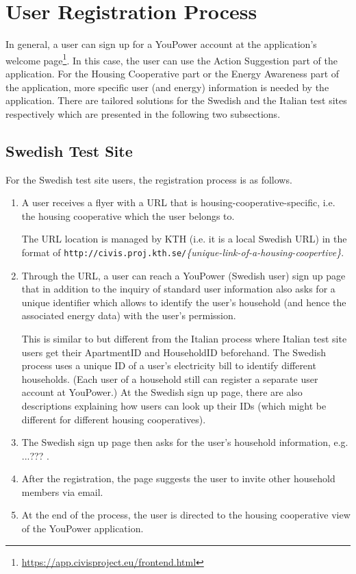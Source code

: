 \section{User Registration Process}

In general, a user can sign up for a YouPower account at the application's welcome page\footnote{\url{https://app.civisproject.eu/frontend.html}}. In this case, the user can use the Action Suggestion part of the application. For the Housing Cooperative part or the Energy Awareness part of the application, more specific user (and energy) information is needed by the application. There are tailored solutions for the Swedish and the Italian test sites respectively which are presented in the following two subsections. 

\subsection{Swedish Test Site}

For the Swedish test site users, the registration process is as follows. 

\begin{enumerate}
\item A user receives a flyer with a URL that is housing-cooperative-specific, i.e. the housing cooperative which the user belongs to. 

The URL location is managed by KTH (i.e. it is a local Swedish URL) in the format of  \texttt{\small http://civis.proj.kth.se/}\textit{\{unique-link-of-a-housing-coopertive\}}. 

\item Through the URL, a user can reach a YouPower (Swedish user) sign up page that in addition to the inquiry of standard user information also asks for a unique identifier which allows to identify the user's household (and hence the associated energy data) with the user's permission. 

This is similar to but different from the Italian process where Italian test site users get their ApartmentID and HouseholdID beforehand. The Swedish process uses a unique ID of a user's electricity bill to identify different households. (Each user of a household still can register a separate user account at YouPower.) At the Swedish sign up page, there are also descriptions explaining how users can look up their IDs (which might be different for different housing cooperatives). 

\item The Swedish sign up page then asks for the user's household information, e.g. ...??? . 

\item After the registration, the page suggests the user to invite other household members via email.

\item At the end of the process, the user is directed to the housing cooperative view of the YouPower application. 

\end{enumerate}

